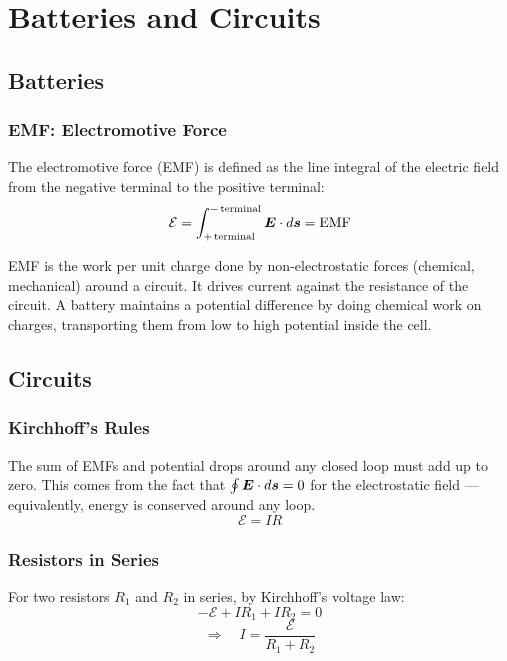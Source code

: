 \chapter{Batteries and Circuits}

\section{Batteries}

\subsection{EMF: Electromotive Force}

\begin{definition}[EMF]
The electromotive force (EMF) is defined as the line integral of the electric field from the negative terminal to the positive terminal:
\[
    \mathcal{E} = \int_{+\,\text{terminal}}^{-\,\text{terminal}} \vect{E}\cdot d\lvect{s} = \text{EMF}
\]
\end{definition}

EMF is the work per unit charge done by non-electrostatic forces (chemical, mechanical) around a circuit. It drives current against the resistance of the circuit. A battery maintains a potential difference by doing chemical work on charges, transporting them from low to high potential inside the cell.

\section{Circuits}

\subsection{Kirchhoff's Rules}

\begin{theorem}
The sum of EMFs and potential drops around any closed loop must add up to zero. This comes from the fact that $\oint \vect{E}\cdot d\lvect{s} = 0$ for the electrostatic field — equivalently, energy is conserved around any loop.
\[
    \mathcal{E} = IR
\]
\end{theorem}

\subsection{Resistors in Series}

For two resistors $R_1$ and $R_2$ in series, by Kirchhoff's voltage law:
\[
    -\mathcal{E} + IR_1 + IR_2 = 0
\]
\[
    \Rightarrow \quad I = \frac{\mathcal{E}}{R_1 + R_2}
\]


